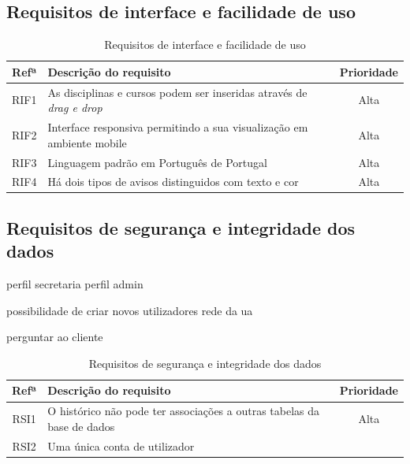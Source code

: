 \documentclass[11pt, twoside]{report}
\begin{document}
	\subsection{Requisitos de interface e facilidade de uso}

	
	\begin{table}[H]
	\caption{Requisitos de interface e facilidade de uso}
	
	\begin{center}
		\begin{tabularx}{\textwidth}{|c|X|c|}
			\hline
			\textbf{Refª }	& \textbf{Descrição do requisito} & \textbf{Prioridade} \\
			\hline
			RIF1 & As disciplinas e cursos podem ser inseridas através de \textit{drag e drop} &Alta\\
			\hline
			RIF2 & Interface responsiva permitindo a sua visualização em ambiente mobile &Alta\\
			\hline
			RIF3 & Linguagem padrão em Português de Portugal &Alta\\
			\hline
			RIF4 & Há dois tipos de avisos distinguidos com texto e cor &Alta\\
			\hline
		\end{tabularx}
		\label{requisitosdeinterface}
	\end{center}
	\end{table}

	\subsection{Requisitos de segurança e integridade dos dados}
	
	perfil secretaria 
perfil admin

possibilidade de criar novos utilizadores
rede da ua

perguntar ao cliente
\begin{table}[H]	
	\caption{Requisitos de segurança e integridade dos dados}
	
	
	\begin{center}
		\begin{tabularx}{\textwidth}{|c|X|c|}
			\hline
			\textbf{Refª }	& \textbf{Descrição do requisito} & \textbf{Prioridade} \\
			\hline
			RSI1 &O histórico não pode ter associações a outras tabelas da base de dados  &Alta\\
			\hline
			RSI2 & Uma única conta de utilizador&\\
			\hline
		\end{tabularx}
		\label{requisitosdeseguranca}
	\end{center}
\end{table}
\end{document}
